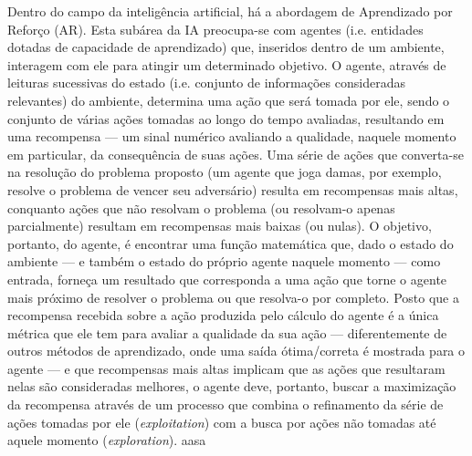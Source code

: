 \documentclass[cic,tc]{iiufrgs}
\begin{document}
 Dentro do campo da inteligência artificial, há a abordagem de Aprendizado por
 Reforço (AR). Esta subárea da IA preocupa-se com agentes (i.e.  entidades dotadas
 de capacidade de aprendizado) que, inseridos dentro de um ambiente, interagem com
 ele para atingir um determinado objetivo. O agente, através de leituras sucessivas
 do estado (i.e. conjunto de informações consideradas relevantes) do ambiente,
 determina uma ação que será tomada por ele, sendo o conjunto de várias ações
 tomadas ao longo do tempo avaliadas, resultando em uma recompensa --- um
 sinal numérico avaliando a qualidade, naquele momento em particular, da
 consequência de suas ações. Uma série de ações que converta-se na resolução do
 problema proposto (um agente que joga damas, por exemplo, resolve o problema de
 vencer seu adversário) resulta em recompensas mais altas, conquanto ações que
 não resolvam o problema (ou resolvam-o apenas parcialmente) resultam em
 recompensas mais baixas (ou nulas). O objetivo, portanto, do agente, é encontrar
 uma função matemática que, dado o estado do ambiente  --- e também o estado do
 próprio agente naquele momento --- como entrada, forneça um resultado que
 corresponda a uma ação que torne o agente mais próximo de resolver o problema
 ou que resolva-o por completo. Posto que a recompensa recebida sobre a ação produzida
 pelo cálculo do agente é a única métrica que ele tem para avaliar a qualidade
 da sua ação --- diferentemente de outros métodos de aprendizado, onde uma
 saída ótima/correta é mostrada para o agente --- e que recompensas mais altas
 implicam que as ações que resultaram nelas são consideradas melhores, o agente
 deve, portanto, buscar a maximização da recompensa através de um processo que
 combina o refinamento da série de ações tomadas por ele (\textit{exploitation}) com a busca por ações não tomadas
 até aquele momento (\textit{exploration}).
aasa
\end{document}
